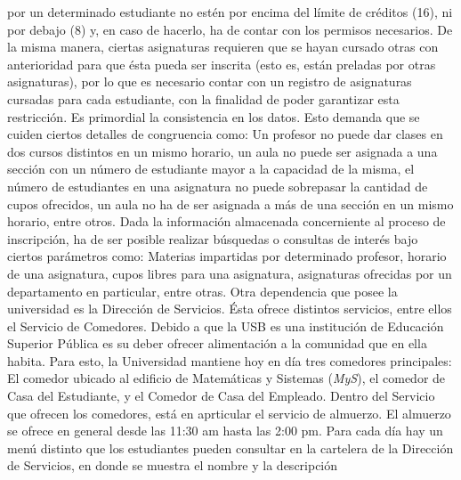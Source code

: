 \documentclass[12pt,a4paper,spanish]{article}
\begin{document}
por un determinado estudiante no est\'en por encima del l\'imite de cr\'editos (16), ni por debajo (8) y, en caso de hacerlo, ha de contar con los permisos necesarios. 
De la misma manera, ciertas asignaturas requieren que se hayan cursado otras con anterioridad para que \'esta pueda ser inscrita (esto es, est\'an preladas por otras asignaturas), 
por lo que es necesario contar con un registro de asignaturas cursadas para cada estudiante, con la finalidad de poder garantizar esta restricci\'on.
\newline
\newline
\indent Es primordial la consistencia en los datos. Esto demanda que
se cuiden ciertos detalles de congruencia como: Un profesor no puede
dar clases en dos cursos distintos en un mismo horario, un aula no
puede ser asignada a una secci\'on con un n\'umero de estudiante mayor
a la capacidad de la misma, el n\'umero de estudiantes en una
asignatura no puede sobrepasar la cantidad de cupos ofrecidos, un aula
no ha de ser asignada a m\'as de una secci\'on en un mismo horario,
entre otros.
\newline
\newline
\indent Dada la informaci\'on almacenada concerniente al proceso de
inscripci\'on, ha de ser posible realizar b\'usquedas o consultas de
inter\'es bajo ciertos par\'ametros como: Materias impartidas por
determinado profesor, horario de una asignatura, cupos libres para una asignatura, asignaturas ofrecidas por un departamento en particular, entre otras.
\newline
\newline
\indent Otra dependencia que posee la universidad es  la Direcci\'on
de Servicios. \'Esta ofrece distintos servicios, entre ellos el
Servicio de Comedores. Debido a que la USB es una instituci\'on de
Educaci\'on Superior P\'ublica es su deber ofrecer
alimentaci\'on a la comunidad que en ella habita. Para esto, la
Universidad mantiene hoy en d\'ia tres comedores principales: El
comedor ubicado al edificio de Matem\'aticas y Sistemas (\emph{MyS}),
el comedor de Casa del Estudiante, y el Comedor de Casa del
Empleado. 
\newline
\newline
\indent Dentro del Servicio que ofrecen los comedores, est\'a en aprticular el
servicio de almuerzo. El almuerzo se ofrece en general desde las 11:30 am hasta las 2:00 pm. Para cada d\'ia hay un men\'u distinto que los
estudiantes pueden consultar en la cartelera de la Direcci\'on de Servicios, en donde se muestra el nombre y la descripci\'on
\end{document}
